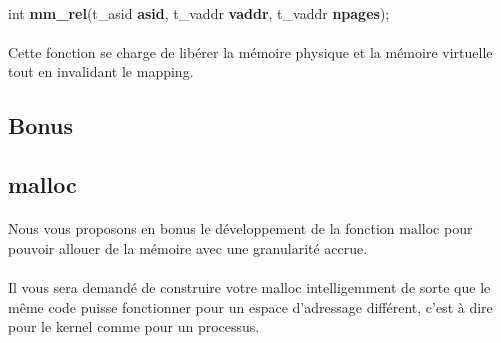 \documentclass[10pt,a4wide]{article}
\begin{document}
\paragraph{}

\hspace{1.5cm}int \textbf{mm\_rel}(t\_asid \textbf{asid},
                                   t\_vaddr \textbf{vaddr},
                                   t\_vaddr \textbf{npages});

\paragraph{}

Cette fonction se charge de lib\'erer la m\'emoire physique et la m\'emoire
virtuelle tout en invalidant le mapping.

\subsection{Bonus}

\subsection{malloc}

\paragraph{}

Nous vous proposons en bonus le d\'eveloppement de la fonction malloc
pour pouvoir allouer de la m\'emoire avec une granularit\'e accrue.

\paragraph{}

Il vous sera demand\'e de construire votre malloc intelligemment de sorte
que le m\^eme code puisse fonctionner pour un espace d'adressage diff\'erent,
c'est \`a dire pour le kernel comme pour un processus.
\end{document}

